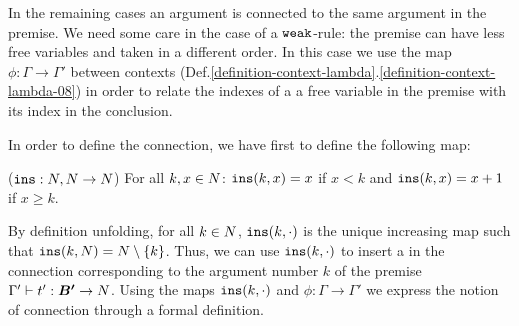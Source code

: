 In the remaining cases an argument is connected to the same argument in the 
premise. We need some care in the case of a ${\tt weak}$-rule: the premise can
have less free variables and taken in a different order. 
In this case we use the map $\phi:\Gamma \rightarrow \Gamma'$ between contexts 
(Def.\ref{definition-context-lambda}.\ref{definition-context-lambda-08}) 
in order to relate the indexes of a a free variable in the premise with its index in the 
conclusion. 

In order to define the connection, we have first to define the following map:

\begin{definition}(${\tt ins}:{N},{N} \rightarrow {N}$)
For all $k,x \in {N}$: ${\tt ins}(k,x)=x$ if $x < k$ and ${\tt ins}(k,x)=x+1$ if $x \ge k$. 
\end{definition}

By definition unfolding, for all $k \in {N}$, ${\tt ins}(k,\cdot)$ is the unique increasing 
map such that ${\tt ins}(k,{N}) = {N} \setminus \{k\}$. 
Thus, we can use ${\tt ins}(k,\cdot)$ to insert a  in the 
connection corresponding to the argument number $k$ of the premise 
$\Gamma' \vdash t':\vec{B'} \rightarrow \N$. 
Using the maps ${\tt ins}(k,\cdot)$ and $\phi:\Gamma \rightarrow \Gamma'$ we 
express the notion of connection through a formal definition.



